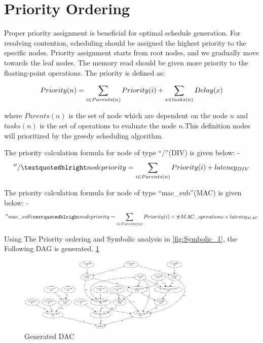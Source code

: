 \section{Priority Ordering}

Proper priority assignment is beneficial for optimal schedule generation. For resolving contention, scheduling should be assigned the highest priority to the specific nodes. Priority assignment starts from root nodes, and we gradually move towards the leaf nodes. The memory read should be given more priority to the floating-point operations. The priority is defined as:
\begin{tcolorbox}
\begin{equation*}
    \centering
    Priority(n) = \sum_{i \in Parents(n)} Priority(i) + \sum_{x \in tasks(n)} Delay(x)
\end{equation*}
\end{tcolorbox}

where $Parents(n)$ is the set of node which are dependent on the node $n$ and $tasks(n)$ is the set of operations to evaluate the node $n$.This definition nodes will prioritized by the greedy scheduling  algorithm.

The priority calculation formula for node of type “/”(DIV) is given below: -
\begin{equation*}
    \centering
    ''/” node priority = \sum_{i \in Parents(n)} Priority(i) + latency_{DIV}
\end{equation*}

The priority calculation formula for node of type “mac\_sub”(MAC) is given below: -
\begin{equation*}
    \centering
    ''mac\_sub” node priority = \sum_{i \in Parents(n)} Priority(i) +\#MAC\_operations \times latency_{MAC}
\end{equation*}

Using The Priority ordering and Symbolic analysis in \ref{fig:Symbolic_1},  the Following DAG is generated, \ref{fig:DAG_gen}
\begin{figure}[H]
    \centering
    \includegraphics[width = 0.75\textwidth]{./Scheduler/exeTree.png}
    \caption{Generated DAC}
    \label{fig:DAG_gen}
\end{figure}


